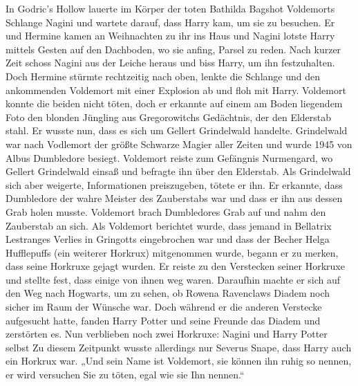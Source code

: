\documentclass[a4paper, 10pt]{article}
\begin{document}
\vspace{10pt}
\newline
{}  
In Godric's Hollow lauerte im Körper der toten Bathilda Bagshot Voldemorts Schlange Nagini und wartete darauf, dass Harry kam, um sie zu besuchen. Er und Hermine kamen an Weihnachten zu ihr ins Haus und Nagini lotste Harry mittels Gesten auf den Dachboden, wo sie anfing, Parsel zu reden. Nach kurzer Zeit schoss Nagini aus der Leiche heraus und biss Harry, um ihn festzuhalten. Doch Hermine stürmte rechtzeitig nach oben, lenkte die Schlange und den ankommenden Voldemort mit einer Explosion ab und floh mit Harry. Voldemort konnte die beiden nicht töten, doch er erkannte auf einem am Boden liegendem Foto den blonden Jüngling aus Gregorowitchs Gedächtnis, der den Elderstab stahl. Er wusste nun, dass es sich um Gellert Grindelwald handelte. Grindelwald war nach Vodlemort der größte Schwarze Magier aller Zeiten und wurde 1945 von Albus Dumbledore besiegt.
\vspace{10pt}
\newline
{}  
Voldemort reiste zum Gefängnis Nurmengard, wo Gellert Grindelwald einsaß und befragte ihn über den Elderstab. Als Grindelwald sich aber weigerte, Informationen preiszugeben, tötete er ihn. Er erkannte, dass Dumbledore der wahre Meister des Zauberstabs war und dass er ihn aus dessen Grab holen musste. Voldemort brach Dumbledores Grab auf und nahm den Zauberstab
an sich.
\vspace{10pt}
\newline
{}  
Als Voldemort berichtet wurde, dass jemand in Bellatrix Lestranges Verlies in Gringotts eingebrochen war und  dass der Becher Helga Hufflepuffs (ein weiterer Horkrux) mitgenommen wurde, begann er zu merken, dass seine Horkruxe gejagt wurden. Er reiste zu den Verstecken seiner Horkruxe und stellte fest, dass einige von ihnen weg waren. Daraufhin machte er sich auf den Weg nach Hogwarts, um zu sehen, ob Rowena Ravenclaws Diadem noch sicher im Raum der Wünsche war. Doch während er die anderen Verstecke aufgesucht hatte, fanden Harry Potter und seine Freunde das Diadem und zerstörten es. Nun verblieben noch zwei Horkruxe: Nagini und Harry Potter selbst Zu diesem Zeitpunkt wusste allerdings nur Severus Snape, dass Harry auch ein Horkrux war.
\vspace{10pt}
\newline
{}  
„Und sein Name ist Voldemort, sie können ihn ruhig so nennen, er wird versuchen Sie zu töten, egal wie sie Ihn nennen.“
\vspace{10pt}
\end{document}
